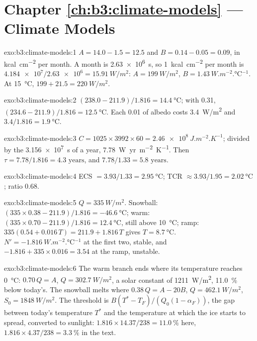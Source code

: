\section*{Chapter \ref{ch:b3:climate-models} --- Climate Models}

\begin{solution}{exo:b3:climate-models:1}
$A = 14.0 - 1.5 = \num{12.5}$ and $B = 0.14 - 0.05 = \num{0.09}$, in
\unit{kcal.cm^{-2}} per month. A month is \qty{2.63e6}{s}, so
\qty{1}{kcal.cm^{-2}} per month is $\num{4.184e7}/\num{2.63e6} =
\qty{15.91}{W/m^2}$: $A = \qty{199}{W/m^2}$, $B =
\qty{1.43}{W.m^{-2}.\celsius^{-1}}$. At \qty{15}{\celsius}, $199 + 21.5 =
\qty{220}{W/m^2}$.
\end{solution}

\begin{solution}{exo:b3:climate-models:2}
$(238.0 - 211.9)/1.816 = \qty{14.4}{\celsius}$; with 0.31, $(234.6 -
211.9)/1.816 = \qty{12.5}{\celsius}$. Each 0.01 of albedo costs
\qty{3.4}{W/m^2} and $3.4/1.816 = \qty{1.9}{\celsius}$.
\end{solution}

\begin{solution}{exo:b3:climate-models:3}
$C = 1025\times3992\times60 = \qty{2.46e8}{J.m^{-2}.K^{-1}}$; divided by
the \qty{3.156e7}{s} of a year, \qty{7.78}{W.yr.m^{-2}.K^{-1}}. Then $\tau
= 7.78/1.816 = \num{4.3}\text{ years}$, and $7.78/1.33 = \num{5.8}\text{ years}$.
\end{solution}

\begin{solution}{exo:b3:climate-models:4}
ECS $= 3.93/1.33 = \qty{2.95}{\celsius}$; TCR $\approx 3.93/1.95 =
\qty{2.02}{\celsius}$; ratio \num{0.68}.
\end{solution}

\begin{solution}{exo:b3:climate-models:5}
$Q = \qty{335}{W/m^2}$. Snowball: $(335\times0.38 - 211.9)/1.816 =
\qty{-46.6}{\celsius}$; warm: $(335\times0.70 - 211.9)/1.816 =
\qty{12.4}{\celsius}$, still above \qty{10}{\celsius}; ramp: $335(0.54 +
0.016\,T) = 211.9 + 1.816\,T$ gives $T = \qty{8.7}{\celsius}$. $N' =
\qty{-1.816}{W.m^{-2}.\celsius^{-1}}$ at the first two, stable, and $-1.816
+ 335\times0.016 = \num{+3.54}$ at the ramp, unstable.
\end{solution}

\begin{solution}{exo:b3:climate-models:6}
The warm branch ends where its temperature reaches \qty{0}{\celsius}:
$0.70\,Q = A$, $Q = \qty{302.7}{W/m^2}$, a solar constant of
\qty{1211}{W/m^2}, \qty{11.0}{\percent} below today's. The snowball melts
where $0.38\,Q = A - 20B$, $Q = \qty{462.1}{W/m^2}$, $S_0 =
\qty{1848}{W/m^2}$. The threshold is $B(T^* - T_F)/(Q_0(1 - \alpha_F))$,
the gap between today's temperature $T^*$ and the temperature at which the
ice starts to spread, converted to sunlight: $1.816\times14.37/238 =
\qty{11.0}{\percent}$ here, $1.816\times4.37/238 = \qty{3.3}{\percent}$ in
the text.
\end{solution}

